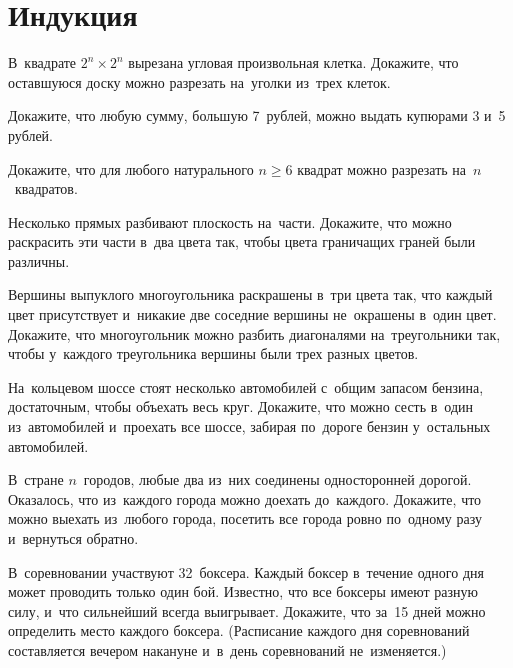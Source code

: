 

\section*{Индукция}


\begin{problems}

В~квадрате $2^n \times 2^n$ вырезана
\quad
\sp угловая
\quad
\sp произвольная
\quad
клетка.
Докажите, что оставшуюся доску можно разрезать на~уголки из~трех клеток.

\item
Докажите, что любую сумму, большую 7~рублей, можно выдать купюрами 3 и~5
рублей.

\item
Докажите, что для любого натурального $n \geq 6$ квадрат можно разрезать
на~$n$~квадратов.

\item
Несколько прямых разбивают плоскость на~части.
Докажите, что можно раскрасить эти части в~два цвета так, чтобы цвета
граничащих граней были различны.

\item
Вершины выпуклого многоугольника раскрашены в~три цвета так, что каждый цвет
присутствует и~никакие две соседние вершины не~окрашены в~один цвет.
Докажите, что многоугольник можно разбить диагоналями на~треугольники так,
чтобы у~каждого треугольника вершины были трех разных цветов.

\item
На~кольцевом шоссе стоят несколько автомобилей с~общим запасом бензина,
достаточным, чтобы объехать весь круг.
Докажите, что можно сесть в~один из~автомобилей и~проехать все шоссе, забирая
по~дороге бензин у~остальных автомобилей.

\item
В~стране $n$~городов, любые два из~них соединены односторонней дорогой.
Оказалось, что из~каждого города можно доехать до~каждого.
Докажите, что можно выехать из~любого города, посетить все города ровно
по~одному разу и~вернуться обратно.

\item
В~соревновании участвуют 32~боксера.
Каждый боксер в~течение одного дня может проводить только один бой.
Известно, что все боксеры имеют разную силу, и~что сильнейший всегда
выигрывает.
Докажите, что за~15 дней можно определить место каждого боксера.
(Расписание каждого дня соревнований составляется вечером накануне и~в~день
соревнований не~изменяется.)

\end{problems}

